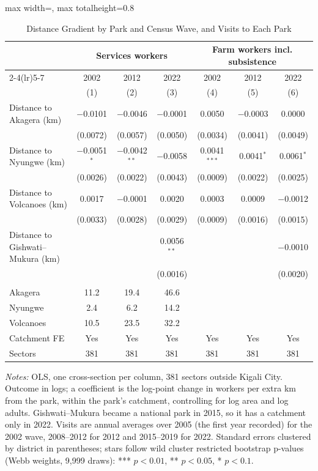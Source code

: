 \documentclass[11pt]{article}
\begin{document}
\begin{table}[H]
\centering\footnotesize\setlength{\tabcolsep}{4pt}
\caption{Distance Gradient by Park and Census Wave, and Visits to Each Park}
\label{tab:mt_dose}
\begin{adjustbox}{max width=\textwidth, max totalheight=0.8\textheight}
\begin{tabular}{lcccccc}
\toprule
 & \multicolumn{3}{c}{Services workers} & \multicolumn{3}{c}{Farm workers incl. subsistence} \\
\cmidrule(lr){2-4}\cmidrule(lr){5-7}
 & 2002 & 2012 & 2022 & 2002 & 2012 & 2022 \\
 & (1) & (2) & (3) & (4) & (5) & (6) \\
\midrule
Distance to Akagera (km) & $-$0.0101 & $-$0.0046 & $-$0.0001 & 0.0050 & $-$0.0003 & 0.0000 \\
 & (0.0072) & (0.0057) & (0.0050) & (0.0034) & (0.0041) & (0.0049) \\
Distance to Nyungwe (km) & $-$0.0051$^{*}$ & $-$0.0042$^{**}$ & $-$0.0058 & 0.0041$^{***}$ & 0.0041$^{*}$ & 0.0061$^{*}$ \\
 & (0.0026) & (0.0022) & (0.0043) & (0.0009) & (0.0022) & (0.0025) \\
Distance to Volcanoes (km) & 0.0017 & $-$0.0001 & 0.0020 & 0.0003 & 0.0009 & $-$0.0012 \\
 & (0.0033) & (0.0028) & (0.0029) & (0.0009) & (0.0016) & (0.0015) \\
Distance to Gishwati--Mukura (km) &  &  & 0.0056$^{**}$ &  &  & $-$0.0010 \\
 &  &  & (0.0016) &  &  & (0.0020) \\
\addlinespace
\multicolumn{7}{l}{\textit{Visits per year (thousands)}} \\
\quad Akagera & 11.2 & 19.4 & 46.6 &  &  &  \\
\quad Nyungwe & 2.4 & 6.2 & 14.2 &  &  &  \\
\quad Volcanoes & 10.5 & 23.5 & 32.2 &  &  &  \\
\midrule
Catchment FE & Yes & Yes & Yes & Yes & Yes & Yes \\
Sectors & 381 & 381 & 381 & 381 & 381 & 381 \\
\bottomrule
\end{tabular}
\end{adjustbox}
\begin{minipage}{0.97\textwidth}\scriptsize
\textit{Notes:} OLS, one cross-section per column, 381 sectors outside Kigali City. Outcome in logs; a coefficient is the log-point change in workers per extra km from the park, within the park's catchment, controlling for log area and log adults. Gishwati--Mukura became a national park in 2015, so it has a catchment only in 2022. Visits are annual averages over 2005 (the first year recorded) for the 2002 wave, 2008--2012 for 2012 and 2015--2019 for 2022. Standard errors clustered by district in parentheses; stars follow wild cluster restricted bootstrap p-values (Webb weights, 9,999 draws): *** $p<0.01$, ** $p<0.05$, * $p<0.1$.
\end{minipage}
\end{table}
\end{document}
